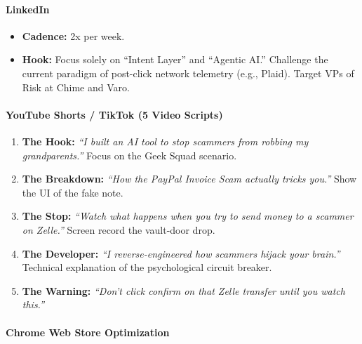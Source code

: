 \documentclass[
]{article}
\providecommand{\tightlist}{%
  \setlength{\itemsep}{0pt}\setlength{\parskip}{0pt}}
\begin{document}
\paragraph{LinkedIn}\label{linkedin}

\begin{itemize}
\tightlist
\item
  \textbf{Cadence:} 2x per week.
\item
  \textbf{Hook:} Focus solely on ``Intent Layer'' and ``Agentic AI.''
  Challenge the current paradigm of post-click network telemetry (e.g.,
  Plaid). Target VPs of Risk at Chime and Varo.
\end{itemize}

\paragraph{YouTube Shorts / TikTok (5 Video
Scripts)}\label{youtube-shorts-tiktok-5-video-scripts}

\begin{enumerate}
\def\labelenumi{\arabic{enumi}.}
\tightlist
\item
  \textbf{The Hook:} \emph{``I built an AI tool to stop scammers from
  robbing my grandparents.''} Focus on the Geek Squad scenario.
\item
  \textbf{The Breakdown:} \emph{``How the PayPal Invoice Scam actually
  tricks you.''} Show the UI of the fake note.
\item
  \textbf{The Stop:} \emph{``Watch what happens when you try to send
  money to a scammer on Zelle.''} Screen record the vault-door drop.
\item
  \textbf{The Developer:} \emph{``I reverse-engineered how scammers
  hijack your brain.''} Technical explanation of the psychological
  circuit breaker.
\item
  \textbf{The Warning:} \emph{``Don't click confirm on that Zelle
  transfer until you watch this.''}
\end{enumerate}

\paragraph{Chrome Web Store
Optimization}\label{chrome-web-store-optimization}
\end{document}

